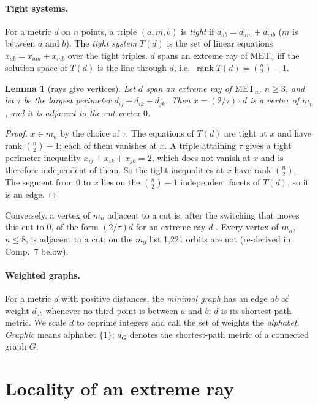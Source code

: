 \documentclass[11pt,a4paper]{article}
\newtheorem{lemma}[theorem]{Lemma}
\theoremstyle{definition}
\theoremstyle{remark}
\newcommand{\MET}{\mathrm{MET}}
\begin{document}
\paragraph{Tight systems.} For a metric $d$ on $n$ points, a triple $(a, m, b)$ is \emph{tight} if
$d_{ab} = d_{am} + d_{mb}$ ($m$ is between $a$ and $b$). The \emph{tight system} $T(d)$ is the set of linear
equations $x_{ab} = x_{am} + x_{mb}$ over the tight triples. $d$ spans an extreme ray of $\MET_n$ iff the solution
space of $T(d)$ is the line through $d$, i.e.\ $\operatorname{rank} T(d) = \binom n2 - 1$.

\begin{lemma}[rays give vertices]\label{lem:vertex}
Let $d$ span an extreme ray of $\MET_n$, $n \ge 3$, and let $\tau$ be the largest perimeter
$d_{ij} + d_{ik} + d_{jk}$. Then $x = (2/\tau)\cdot d$ is a vertex of $m_n$, and it is adjacent to the cut vertex $0$.
\end{lemma}

\begin{proof}
$x \in m_n$ by the choice of $\tau$. The equations of $T(d)$ are tight at $x$ and have rank $\binom n2 - 1$; each of
them vanishes at $x$. A triple attaining $\tau$ gives a tight perimeter inequality $x_{ij} + x_{ik} + x_{jk} = 2$,
which does not vanish at $x$ and is therefore independent of them. So the tight inequalities at $x$ have rank
$\binom n2$. The segment from $0$ to $x$ lies on the $\binom n2 - 1$ independent facets of $T(d)$, so it is an edge.
\end{proof}

Conversely, a vertex of $m_n$ adjacent to a cut is, after the switching that moves this cut to $0$, of the form
$(2/\tau)d$ for an extreme ray $d$ \cite{LP92}. Every vertex of $m_n$, $n \le 8$, is adjacent to a cut; on the $m_9$
list 1,221 orbits are not \cite{DI07} (re-derived in Comp.~7 below).

\paragraph{Weighted graphs.} For a metric $d$ with positive distances, the \emph{minimal graph} has an edge $ab$ of
weight $d_{ab}$ whenever no third point is between $a$ and $b$; $d$ is its shortest-path metric. We scale $d$ to
coprime integers and call the set of weights the \emph{alphabet}. \emph{Graphic} means alphabet $\{1\}$; $d_G$
denotes the shortest-path metric of a connected graph $G$.

\section{Locality of an extreme ray}\label{sec:locality}
\end{document}
